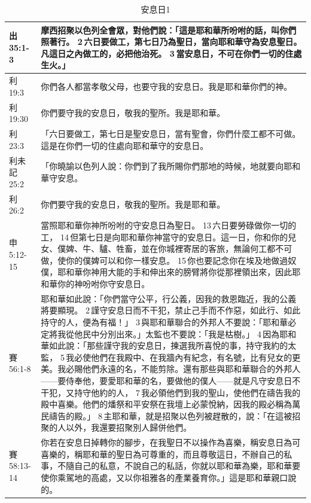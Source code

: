 \begin{table}[H]
\begin{tabular}{p{2cm}|p{14.5cm}}
出 35:1-3&
摩西招聚以色列全會眾，對他們說：「這是耶和華所吩咐的話，叫你們照著行。 2 六日要做工，第七日乃為聖日，當向耶和華守為安息聖日。凡這日之內做工的，必把他治死。 3 當安息日，不可在你們一切的住處生火。」\\\hline

利 19:3&你們各人都當孝敬父母，也要守我的安息日。我是耶和華你們的神。\\\hline


利 19:30&你們要守我的安息日，敬我的聖所。我是耶和華。\\\hline

利 23:3&
「六日要做工，第七日是聖安息日，當有聖會，你們什麼工都不可做。這是在你們一切的住處向耶和華守的安息日。\\\hline

利未記 25:2&
「你曉諭以色列人說：你們到了我所賜你們那地的時候，地就要向耶和華守安息。\\\hline
利 26:2&你們要守我的安息日，敬我的聖所。我是耶和華。\\\hline
申 5:12-15&當照耶和華你神所吩咐的守安息日為聖日。 13 六日要勞碌做你一切的工， 14 但第七日是向耶和華你神當守的安息日。這一日，你和你的兒女、僕婢、牛、驢、牲畜，並在你城裡寄居的客旅，無論何工都不可做，使你的僕婢可以和你一樣安息。 15 你也要記念你在埃及地做過奴僕，耶和華你神用大能的手和伸出來的膀臂將你從那裡領出來，因此耶和華你的神吩咐你守安息日。\\\hline



賽 56:1-8&
耶和華如此說：「你們當守公平，行公義，因我的救恩臨近，我的公義將要顯現。 2 謹守安息日而不干犯，禁止己手而不作惡，如此行、如此持守的人，便為有福！」 3 與耶和華聯合的外邦人不要說：「耶和華必定將我從他民中分別出來。」太監也不要說：「我是枯樹。」 4 因為耶和華如此說：「那些謹守我的安息日，揀選我所喜悅的事，持守我約的太監， 5 我必使他們在我殿中、在我牆內有紀念，有名號，比有兒女的更美。我必賜他們永遠的名，不能剪除。還有那些與耶和華聯合的外邦人——要侍奉他，要愛耶和華的名，要做他的僕人——就是凡守安息日不干犯，又持守他約的人， 7 我必領他們到我的聖山，使他們在禱告我的殿中喜樂。他們的燔祭和平安祭在我壇上必蒙悅納，因我的殿必稱為萬民禱告的殿。」 8 主耶和華，就是招聚以色列被趕散的，說：「在這被招聚的人以外，我還要招聚別人歸併他們。\\\hline

賽 58:13-14&你若在安息日掉轉你的腳步，在我聖日不以操作為喜樂，稱安息日為可喜樂的，稱耶和華的聖日為可尊重的，而且尊敬這日，不辦自己的私事，不隨自己的私意，不說自己的私話，你就以耶和華為樂，耶和華要使你乘駕地的高處，又以你祖雅各的產業養育你。」這是耶和華親口說的。\\\hline
\end{tabular}
\caption{安息日1}
\end{table}

